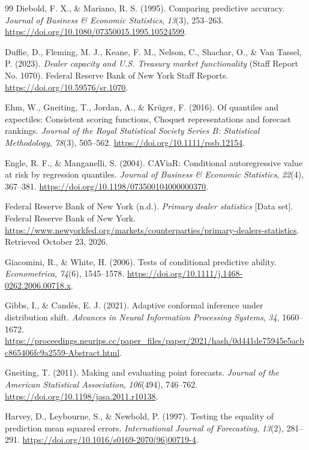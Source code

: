\documentclass[11pt,a4paper]{article}
\begin{document}
\begin{thebibliography}{99}
 Diebold, F. X., \& Mariano, R. S. (1995). Comparing predictive accuracy. \emph{Journal of Business \& Economic Statistics}, \emph{13}(3), 253--263. \url{https://doi.org/10.1080/07350015.1995.10524599}.

 Duffie, D., Fleming, M. J., Keane, F. M., Nelson, C., Shachar, O., \& Van Tassel, P. (2023). \emph{Dealer capacity and U.S. Treasury market functionality} (Staff Report No. 1070). Federal Reserve Bank of New York Staff Reports. \url{https://doi.org/10.59576/sr.1070}.

 Ehm, W., Gneiting, T., Jordan, A., \& Krüger, F. (2016). Of quantiles and expectiles: Consistent scoring functions, Choquet representations and forecast rankings. \emph{Journal of the Royal Statistical Society Series B: Statistical Methodology}, \emph{78}(3), 505--562. \url{https://doi.org/10.1111/rssb.12154}.

 Engle, R. F., \& Manganelli, S. (2004). CAViaR: Conditional autoregressive value at risk by regression quantiles. \emph{Journal of Business \& Economic Statistics}, \emph{22}(4), 367--381. \url{https://doi.org/10.1198/073500104000000370}.

 Federal Reserve Bank of New York (n.d.). \emph{Primary dealer statistics} [Data set]. Federal Reserve Bank of New York. \url{https://www.newyorkfed.org/markets/counterparties/primary-dealers-statistics}. Retrieved October 23, 2026.

 Giacomini, R., \& White, H. (2006). Tests of conditional predictive ability. \emph{Econometrica}, \emph{74}(6), 1545--1578. \url{https://doi.org/10.1111/j.1468-0262.2006.00718.x}.

 Gibbs, I., \& Candès, E. J. (2021). Adaptive conformal inference under distribution shift. \emph{Advances in Neural Information Processing Systems}, \emph{34}, 1660--1672. \url{https://proceedings.neurips.cc/paper_files/paper/2021/hash/0d441de75945e5acbc865406fc9a2559-Abstract.html}.

 Gneiting, T. (2011). Making and evaluating point forecasts. \emph{Journal of the American Statistical Association}, \emph{106}(494), 746--762. \url{https://doi.org/10.1198/jasa.2011.r10138}.

 Harvey, D., Leybourne, S., \& Newbold, P. (1997). Testing the equality of prediction mean squared errors. \emph{International Journal of Forecasting}, \emph{13}(2), 281--291. \url{https://doi.org/10.1016/s0169-2070(96)00719-4}.


\end{thebibliography}
\end{document}
